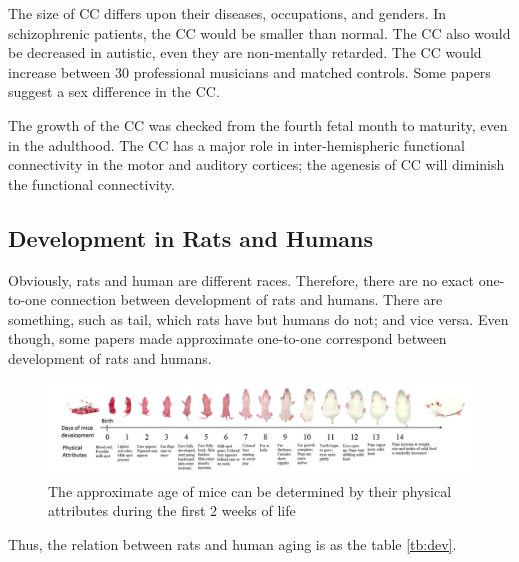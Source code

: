 \documentclass[10pt, a4paper]{article}
\begin{document}
				The size of CC differs upon their diseases, occupations, and genders. In schizophrenic patients, the CC would be smaller than normal. \cite{ref:cc2} The CC also would be decreased in autistic, even they are non-mentally retarded. \cite{ref:cc3} The CC would increase between 30 professional musicians and matched controls. \cite{ref:cc1} Some papers suggest a sex difference in the CC. \cite{ref:cc4}
				
				The growth of the CC was checked from the fourth fetal month to maturity, even in the adulthood. \cite{ref:cc5, ref:cc6} The CC has a major role in inter-hemispheric functional connectivity in the motor and auditory cortices; the agenesis of CC will diminish the functional connectivity. \cite{ref:cc7}
				
			\subsection{Development in Rats and Humans}
				Obviously, rats and human are different races. Therefore, there are no exact one-to-one connection between development of rats and humans. There are something, such as tail, which rats have but humans do not; and vice versa. Even though, some papers made approximate one-to-one correspond between development of rats and humans. \cite{ref:dev1, ref:dev2}
				
				\begin{figure}[htbp]
					\centering
					\includegraphics[width=0.8 \linewidth]{figures/development.png}
					\caption{The approximate age of mice can be determined by their physical attributes during the first 2 weeks of life \protect \cite{ref:dev1}}
				\end{figure}
			
				Thus, the relation between rats and human aging is as the table \ref{tb:dev}.
				
\end{document}
